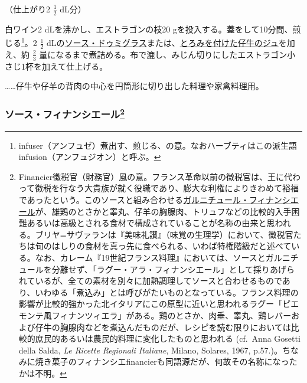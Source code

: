 \begin{recette}

 

（仕上がり2 \(\frac{1}{2}\) dL分）

白ワイン2 dLを沸かし、エストラゴンの枝20
gを投入する。蓋をして10分間、煎じる\footnote{infuser（アンフュゼ）煮出す、煎じる、の意。なおハーブティはこの派生語infusion（アンフュジオン）と呼ぶ。}。2
\(\frac{1}{2}\)
dLの\protect\hyperlink{sauce-demi-glace}{ソース・ドゥミグラス}または、\protect\hyperlink{jus-de-veau-lie}{とろみを付けた仔牛のジュ}を加え、約
\(\frac{2}{3}\)
量になるまで煮詰める。布で漉し、みじん切りにしたエストラゴン小さじ1杯を加えて仕上げる。

\ldots{}\ldots{}仔牛や仔羊の背肉の中心を円筒形に切り出した料理や家禽料理用。

\atoaki{}

\hypertarget{sauce-financiere}{%
\subsubsection[ソース・フィナンシエール]{\texorpdfstring{ソース・フィナンシエール\footnote{Financier徴税官（財務官）風の意。フランス革命以前の徴税官は、王に代わって徴税を行なう大貴族が就く役職であり、膨大な利権によりきわめて裕福であったという。このソースと組み合わせる\protect\hyperlink{garniture-a-la-financiere}{ガルニチュール・フィナンシエール}が、雄鶏のとさかと睾丸、仔羊の胸腺肉、トリュフなどの比較的入手困難あるいは高級とされる食材で構成されていることが名称の由来と思われる。ブリヤ=サヴァランは『美味礼讃』（味覚の生理学）において、徴税官たちは旬のはしりの食材を真っ先に食べられる、いわば特権階級だと述べている。なお、カレーム『19世紀フランス料理』においては、ソースとガルニチュールを分離せず、「ラグー・アラ・フィナンシエール」として採りあげられているが、全ての素材を別々に加熱調理してソースと合わせるものであり、いわゆる「煮込み」とは呼びがたいものとなっている。フランス料理の影響が比較的強かった北イタリアにこの原型に近いと思われるラグー「ピエモンテ風フィナンツィエラ」がある。鶏のとさか、肉垂、睾丸、鶏レバーおよび仔牛の胸腺肉などを煮込んだものだが、レシピを読む限りにおいては比較的庶民的あるいは農民的料理に変化したものと思われる
  (cf.~Anna Gosetti della Salda, \emph{Le Ricette Regionali Italiane},
  Milano, Solares, 1967,
  p.57.)。ちなみに焼き菓子のフィナンシエfinancierも同語源だが、何故その名称になったかは不明。}}{ソース・フィナンシエール}}\label{sauce-financiere}}


\end{recette}
